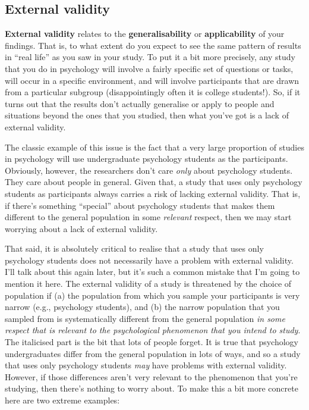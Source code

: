 \documentclass[
]{book}
\begin{document}
\hypertarget{external-validity}{%
\subsection{External validity}\label{external-validity}}

{\textbf{External validity}} relates to the {\textbf{generalisability}} or {\textbf{applicability}} of your findings. That is, to what extent do you expect to see the same pattern of results in ``real life'' as you saw in your study. To put it a bit more precisely, any study that you do in psychology will involve a fairly specific set of questions or tasks, will occur in a specific environment, and will involve participants that are drawn from a particular subgroup (disappointingly often it is college students!). So, if it turns out that the results don't actually generalise or apply to people and situations beyond the ones that you studied, then what you've got is a lack of external validity.

The classic example of this issue is the fact that a very large proportion of studies in psychology will use undergraduate psychology students as the participants. Obviously, however, the researchers don't care \emph{only} about psychology students. They care about people in general. Given that, a study that uses only psychology students as participants always carries a risk of lacking external validity. That is, if there's something ``special'' about psychology students that makes them different to the general population in some \emph{relevant} respect, then we may start worrying about a lack of external validity.

That said, it is absolutely critical to realise that a study that uses only psychology students does not necessarily have a problem with external validity. I'll talk about this again later, but it's such a common mistake that I'm going to mention it here. The external validity of a study is threatened by the choice of population if (a) the population from which you sample your participants is very narrow (e.g., psychology students), and (b) the narrow population that you sampled from is systematically different from the general population \emph{in some respect that is relevant to the psychological phenomenon that you intend to study}. The italicised part is the bit that lots of people forget. It is true that psychology undergraduates differ from the general population in lots of ways, and so a study that uses only psychology students \emph{may} have problems with external validity. However, if those differences aren't very relevant to the phenomenon that you're studying, then there's nothing to worry about. To make this a bit more concrete here are two extreme examples:
\end{document}
